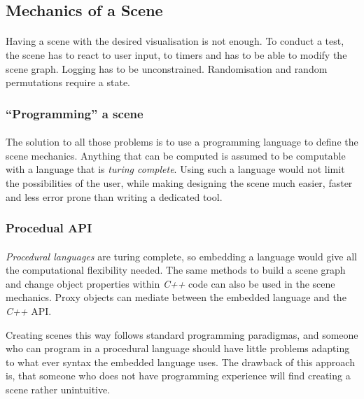\subsection{Mechanics of a Scene\label{sceneMech}}
\paragraph{}
Having a scene with the desired visualisation is not enough. To conduct a test, the scene has to react to user input, to timers and has to be able to modify the scene graph. Logging has to be unconstrained. Randomisation and random permutations require a state.

\subsubsection{``Programming'' a scene}
\paragraph{}
The solution to all those problems is to use a programming language to define the scene mechanics. Anything that can be computed is assumed to be computable with a language that is \textit{turing complete}\cite{turing}. Using such a language would not limit the possibilities of the user, while making designing the scene much easier, faster and less error prone than writing a dedicated tool.

\subsubsection{Procedual API}
 \paragraph{}
\textit{Procedural languages} are turing complete, so embedding a language would give all the computational flexibility needed. The same methods to build a scene graph and change object properties within \textit{C++} code can also be used in the scene mechanics. Proxy objects can mediate between the embedded language and the \textit{C++} API.

Creating scenes this way follows standard programming paradigmas, and someone who can program in a procedural language should have little problems adapting to what ever syntax the embedded language uses. The drawback of this approach is, that someone who does not have programming experience will find creating a scene rather unintuitive.

